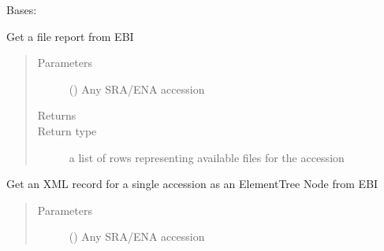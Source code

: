 \documentclass[letterpaper,10pt,english]{sphinxmanual}
\begin{document}
\begin{fulllineitems}
\label{\detokenize{omicidx.sra.ebiutils:omicidx.sra.ebiutils.EBIEna}}
Bases: 

\begin{fulllineitems}
\label{\detokenize{omicidx.sra.ebiutils:omicidx.sra.ebiutils.EBIEna.get_file_report_for_accession}}
Get a file report from EBI
\begin{quote}\begin{description}
\item[{Parameters}] \leavevmode
{} () \textendash{} Any SRA/ENA accession

\item[{Returns}] \leavevmode


\item[{Return type}] \leavevmode
a list of rows representing available files for the accession

\end{description}\end{quote}

\end{fulllineitems}


\begin{fulllineitems}
\label{\detokenize{omicidx.sra.ebiutils:omicidx.sra.ebiutils.EBIEna.get_parsed_xml_for_accession}}
\end{fulllineitems}


\begin{fulllineitems}
\label{\detokenize{omicidx.sra.ebiutils:omicidx.sra.ebiutils.EBIEna.get_xml_for_accession}}
Get an XML record for a single accession as an ElementTree Node from EBI
\begin{quote}\begin{description}
\item[{Parameters}] \leavevmode
{} () \textendash{} Any SRA/ENA accession


\end{description}
\end{quote}
\end{fulllineitems}
\end{fulllineitems}
\end{document}
